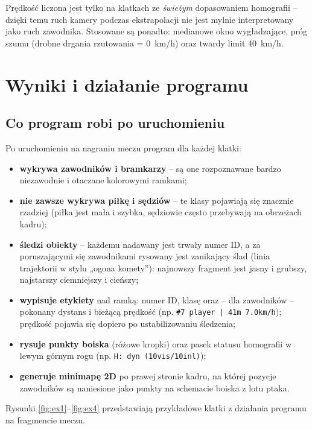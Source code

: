\documentclass[11pt,a4paper]{article}
\begin{document}
Prędkość liczona jest tylko na klatkach ze \emph{świeżym} dopasowaniem
homografii -- dzięki temu ruch kamery podczas ekstrapolacji nie jest mylnie
interpretowany jako ruch zawodnika. Stosowane są ponadto: medianowe okno
wygładzające, próg szumu (drobne drgania rzutowania = 0~km/h) oraz twardy limit
40~km/h.

\section{Wyniki i działanie programu}

\subsection{Co program robi po uruchomieniu}

Po uruchomieniu na nagraniu meczu program dla każdej klatki:
\begin{itemize}[nosep]
  \item \textbf{wykrywa zawodników i bramkarzy} -- są one rozpoznawane bardzo
        niezawodnie i otaczane kolorowymi ramkami;
  \item \textbf{nie zawsze wykrywa piłkę i sędziów} -- te klasy pojawiają się
        znacznie rzadziej (piłka jest mała i szybka, sędziowie często
        przebywają na obrzeżach kadru);
  \item \textbf{śledzi obiekty} -- każdemu nadawany jest trwały numer ID, a za
        poruszającymi się zawodnikami rysowany jest zanikający ślad (linia
        trajektorii w stylu „ogona komety”): najnowszy fragment jest jasny i
        grubszy, najstarszy ciemniejszy i cieńszy;
  \item \textbf{wypisuje etykiety} nad ramką: numer ID, klasę oraz -- dla
        zawodników -- pokonany dystans i bieżącą prędkość (np.
        \texttt{\#7 player | 41m 7.0km/h}); prędkość pojawia się dopiero po
        ustabilizowaniu śledzenia;
  \item \textbf{rysuje punkty boiska} (różowe kropki) oraz pasek statusu
        homografii w lewym górnym rogu (np. \texttt{H: dyn (10vis/10inl)});
  \item \textbf{generuje minimapę 2D} po prawej stronie kadru, na której pozycje
        zawodników są naniesione jako punkty na schemacie boiska z lotu ptaka.
\end{itemize}

Rysunki \ref{fig:ex1}--\ref{fig:ex4} przedstawiają przykładowe klatki z
działania programu na fragmencie meczu.
\end{document}
